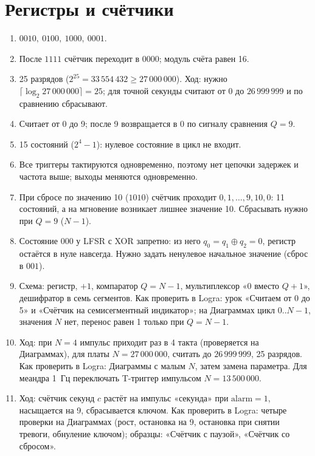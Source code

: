 \section*{Регистры и счётчики}
\begin{enumerate}
  \item {} $0010,\ 0100,\ 1000,\ 0001$.
  \item {} После $1111$ счётчик переходит в $0000$; модуль счёта равен 16.
  \item {} 25 разрядов ($2^{25}=33\,554\,432\ge 27\,000\,000$). Ход: нужно $\lceil\log_2 27\,000\,000\rceil=25$; для точной секунды считают от 0 до $26\,999\,999$ и по сравнению сбрасывают.
  \item {} Считает от 0 до 9; после 9 возвращается в 0 по сигналу сравнения $Q=9$.
  \item {} 15 состояний ($2^4-1$): нулевое состояние в цикл не входит.
  \item {} Все триггеры тактируются одновременно, поэтому нет цепочки задержек и частота выше; выходы меняются одновременно.
  \item {} При сбросе по значению 10 ($1010$) счётчик проходит $0,1,\ldots,9,10,0$: 11 состояний, а на мгновение возникает лишнее значение 10. Сбрасывать нужно при $Q=9$ ($N-1$).
  \item {} Состояние $000$ у LFSR с XOR запретно: из него $q_0=q_1\oplus q_2=0$, регистр остаётся в нуле навсегда. Нужно задать ненулевое начальное значение (сброс в $001$).
  \item {} Схема: регистр, $+1$, компаратор $Q=N-1$, мультиплексор «0 вместо $Q+1$», дешифратор в семь сегментов. Как проверить в Logra: урок «Считаем от 0 до 5» и «Счётчик на семисегментный индикатор»; на Диаграммах цикл $0..N-1$, значения $N$ нет, перенос равен 1 только при $Q=N-1$.
  \item {} Ход: при $N=4$ импульс приходит раз в 4 такта (проверяется на Диаграммах), для платы $N=27\,000\,000$, считать до $26\,999\,999$, 25 разрядов. Как проверить в Logra: Диаграммы с малым $N$, затем замена параметра. Для меандра 1~Гц переключать T-триггер импульсом $N=13\,500\,000$.
  \item {} Ход: счётчик секунд $c$ растёт на импульс «секунда» при $\text{alarm}=1$, насыщается на 9, сбрасывается ключом. Как проверить в Logra: четыре проверки на Диаграммах (рост, остановка на 9, остановка при снятии тревоги, обнуление ключом); образцы: «Счётчик с паузой», «Счётчик со сбросом».
\end{enumerate}

